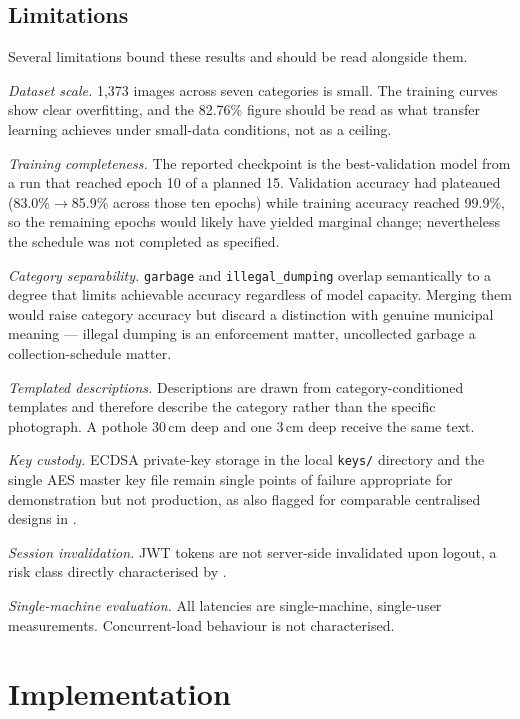 \documentclass[conference]{IEEEtran}
\begin{document}
\subsection{Limitations}
Several limitations bound these results and should be read alongside them.

\emph{Dataset scale.} 1{,}373 images across seven categories is small. The training curves show clear overfitting, and the 82.76\% figure should be read as what transfer learning achieves under small-data conditions, not as a ceiling.

\emph{Training completeness.} The reported checkpoint is the best-validation model from a run that reached epoch 10 of a planned 15. Validation accuracy had plateaued (83.0\%$\rightarrow$85.9\% across those ten epochs) while training accuracy reached 99.9\%, so the remaining epochs would likely have yielded marginal change; nevertheless the schedule was not completed as specified.

\emph{Category separability.} \texttt{garbage} and \texttt{illegal\_dumping} overlap semantically to a degree that limits achievable accuracy regardless of model capacity. Merging them would raise category accuracy but discard a distinction with genuine municipal meaning --- illegal dumping is an enforcement matter, uncollected garbage a collection-schedule matter.

\emph{Templated descriptions.} Descriptions are drawn from category-conditioned templates and therefore describe the category rather than the specific photograph. A pothole 30\,cm deep and one 3\,cm deep receive the same text.

\emph{Key custody.} ECDSA private-key storage in the local \texttt{keys/} directory and the single AES master key file remain single points of failure appropriate for demonstration but not production, as also flagged for comparable centralised designs in \cite{l17decentralizedtrust}.

\emph{Session invalidation.} JWT tokens are not server-side invalidated upon logout, a risk class directly characterised by \cite{l20jwteemo}.

\emph{Single-machine evaluation.} All latencies are single-machine, single-user measurements. Concurrent-load behaviour is not characterised.

\section{Implementation}
\label{sec:implementation}
\end{document}

